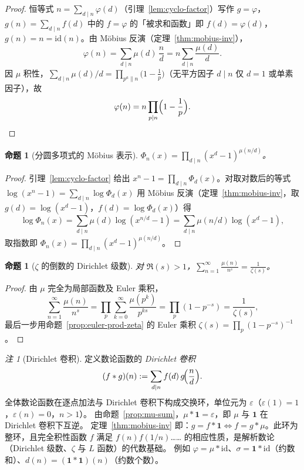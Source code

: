\documentclass{article}
\theoremstyle{plain}
\newtheorem{prop}[thm]{命题}
\theoremstyle{definition}
\theoremstyle{remark}
\newtheorem{rem}[thm]{注}
\begin{document}
\begin{proof}
  恒等式 $n=\sum_{d\mid n}\varphi(d)$（引理~\ref{lem:cyclo-factor}）写作 $g=\varphi$，$g(n)=\sum_{d\mid n}f(d)$ 中的 $f=\varphi$ 的「被求和函数」即 $f(d)=\varphi(d)$，$g(n)=n=\mathrm{id}(n)$。由 Möbius 反演（定理~\ref{thm:mobius-inv}），
  \[
    \varphi(n)=\sum_{d\mid n}\mu(d)\,\frac nd=n\sum_{d\mid n}\frac{\mu(d)}d.
  \]
  因 $\mu$ 积性，$\sum_{d\mid n}\mu(d)/d=\prod_{p^a\parallel n}\bigl(1-\tfrac1p\bigr)$（无平方因子 $d\mid n$ 仅 $d=1$ 或单素因子），故
  \[
    \varphi(n)=n\prod_{p\mid n}\Bigl(1-\frac1p\Bigr). \qedhere
  \]
\end{proof}

\begin{prop}[分圆多项式的 Möbius 表示]\label{prop:cyclo-mobius}
  $\displaystyle\Phi_n(x)=\prod_{d\mid n}(x^d-1)^{\mu(n/d)}$。
\end{prop}

\begin{proof}
  引理~\ref{lem:cyclo-factor} 给出 $x^n-1=\prod_{d\mid n}\Phi_d(x)$。对取对数后的等式
  $\log(x^n-1)=\sum_{d\mid n}\log\Phi_d(x)$ 用 Möbius 反演（定理~\ref{thm:mobius-inv}，取 $g(d)=\log(x^d-1)$，$f(d)=\log\Phi_d(x)$）得
  \[
    \log\Phi_n(x)=\sum_{d\mid n}\mu(d)\log(x^{n/d}-1)=\sum_{d\mid n}\mu(n/d)\log(x^d-1),
  \]
  取指数即 $\Phi_n(x)=\prod_{d\mid n}(x^d-1)^{\mu(n/d)}$。
\end{proof}

\begin{prop}[$\zeta$ 的倒数的 Dirichlet 级数]\label{prop:mu-dirichlet}
  对 $\Re(s)>1$，$\displaystyle\sum_{n=1}^\infty\frac{\mu(n)}{n^s}=\frac1{\zeta(s)}$。
\end{prop}

\begin{proof}
  由 $\mu$ 完全为局部函数及 Euler 乘积，
  \[
    \sum_{n=1}^\infty\frac{\mu(n)}{n^s}
    =\prod_p\sum_{k=0}^\infty\frac{\mu(p^k)}{p^{ks}}
    =\prod_p(1-p^{-s})
    =\frac1{\zeta(s)},
  \]
  最后一步用命题~\ref{prop:euler-prod-zeta} 的 Euler 乘积 $\zeta(s)=\prod_p(1-p^{-s})^{-1}$。
\end{proof}

\begin{rem}[Dirichlet 卷积]
  定义数论函数的 \emph{Dirichlet 卷积}
  \[
    (f*g)(n):=\sum_{d\mid n}f(d)\,g\!\Bigl(\frac nd\Bigr).
  \]
  全体数论函数在逐点加法与 Dirichlet 卷积下构成交换环，单位元为 $\varepsilon$（$\varepsilon(1)=1$，$\varepsilon(n)=0$，$n>1$）。
  由命题~\ref{prop:mu-sum}，$\mu*\mathbf 1=\varepsilon$，即 $\mu$ 与 $\mathbf 1$ 在 Dirichlet 卷积下互逆。
  定理~\ref{thm:mobius-inv} 即：$g=f*\mathbf 1\iff f=g*\mu$。此环为整环，且完全积性函数 $f$ 满足
  $f(n)f(1/n)$…… 的相应性质，是解析数论（Dirichlet 级数、$\zeta$ 与 $L$ 函数）的代数基础。
  例如 $\varphi=\mu*\mathrm{id}$、$\sigma=\mathbf 1*\mathrm{id}$（约数和）、$d(n)=(\mathbf 1*\mathbf 1)(n)$（约数个数）。
\end{rem}
\end{document}
